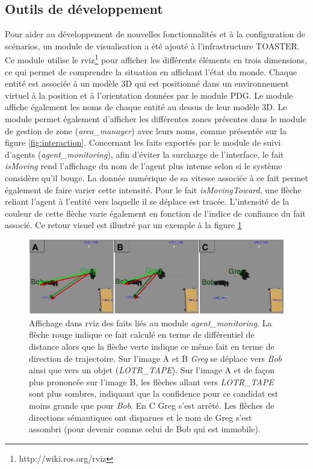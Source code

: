 \documentclass[a4paper,11pt,twoside]{StyleThese}
\begin{document}
\subsection{Outils de développement}
Pour aider au développement de nouvelles fonctionnalités et à la configuration de scénarios, un module de visualisation a été ajouté à l'infrastructure TOASTER. Ce module utilise le rviz\footnote{http://wiki.ros.org/rviz} pour afficher les différents éléments en trois dimensions, ce qui permet de comprendre la situation en affichant l'état du monde. Chaque entité est associée à un modèle 3D qui est positionné dans un environnement virtuel à la position et à l'orientation données par le module PDG. Le module affiche également les noms de chaque entité au dessus de leur modèle 3D. 
Le module permet également d'afficher les différentes zones présentes dans le module de gestion de zone (\textit{area\_manager}) avec leurs noms, comme présentée sur la figure \ref{fig:interaction}.
Concernant les faits exportés par le module de suivi d'agents (\textit{agent\_monitoring}), afin d'éviter la surcharge de l'interface, le fait \textit{isMoving} rend l'affichage du nom de l'agent plus intense selon si le système considère qu'il bouge. La donnée numérique de sa vitesse associée à ce fait permet également de faire varier cette intensité. Pour le fait \textit{isMovingToward}, une flèche reliant l'agent à l'entité vers laquelle il se déplace est tracée. L'intensité de la couleur de cette flèche varie également en fonction de l'indice de confiance du fait associé. Ce retour visuel est illustré par un exemple à la figure \ref{fig:moving}

\begin{figure}[ht!]
 \centering
  \includegraphics[width=1.0\linewidth]{./img/movingToward.jpg} 
  \caption {Affichage dans rviz des faits liés au module \textit{agent\_monitoring}. La flèche rouge indique ce fait calculé en terme de différentiel de distance alors que la flèche verte indique ce même fait en terme de direction de trajectoire. Sur l'image A et B \textit{Greg} se déplace vers \textit{Bob} ainsi que vers un objet (\textit{LOTR\_TAPE}). Sur l'image A et de façon plus prononcée sur l'image B, les flèches allant vers \textit{LOTR\_TAPE} sont plus sombres, indiquant que la confidence pour ce candidat est moins grande que pour \textit{Bob}. En C Greg s'est arrêté. Les flèches de directions sémantiques ont disparues et le nom de Greg s'est assombri (pour devenir comme celui de Bob qui est immobile).}
  \label{fig:moving}
\end{figure}
\end{document}
